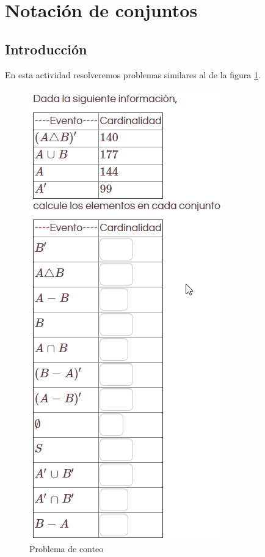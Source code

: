 \section{Notación de conjuntos}

\subsection{Introducción}

En esta actividad resolveremos problemas similares al de la figura \ref{fig:problema-conteo}.

\begin{figure}[h]
	\centering
	\includegraphics[width=0.7\linewidth]{images/2020-08-15 19_49_02}
	\caption{Problema de conteo}
	\label{fig:problema-conteo}
\end{figure}

